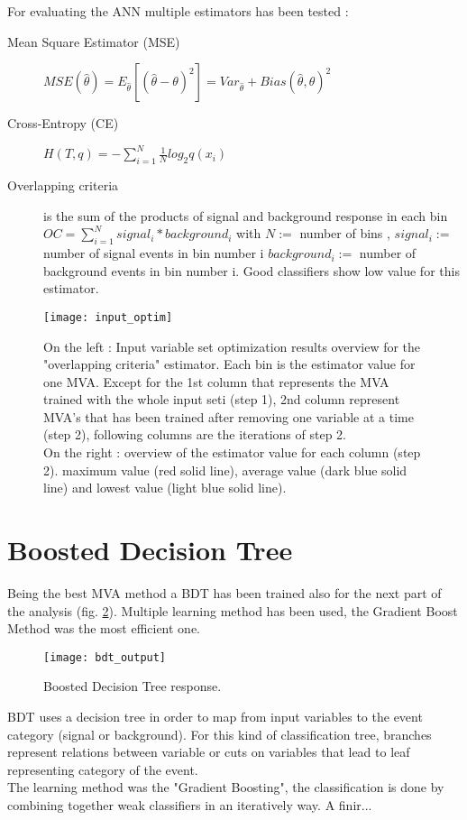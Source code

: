 For evaluating the ANN multiple estimators has been tested :
\begin{description}
	\item [Mean Square Estimator (MSE)] $ MSE(\hat{\theta}) = E_{\hat{\theta}} [(\hat{\theta} - \theta)^2] =
    Var_{\hat{\theta}} + Bias(\hat{\theta}, \theta)^2$
	\item [Cross-Entropy (CE)] $ H(T,q) = -\sum_{i=1}^{N}{\frac{1}{N} log_2 q(x_i)}$
	\item [Overlapping criteria] is the sum of the products of signal and background response in each bin $ OC =
    \sum_{i=1}^{N}{signal_i*background_i} $ with $N :=$ number of bins , $signal_i := $ number of signal events in bin
    number i $background_i := $ number of background events in bin number i. Good classifiers show low value for this estimator.
\end{description}

\begin{figure}[h!]
    \texttt{[image: input\_optim]}
    \caption{On the left : Input variable set optimization results overview for the "overlapping criteria" estimator.
    Each bin is the estimator value for one MVA. Except for
    the 1st column that represents the MVA trained with the whole input seti (step 1), 2nd column
    represent MVA's that has been trained after removing one variable at a time (step 2), following columns are the
    iterations of step 2.\\
    On the right : overview of the estimator value for each column (step 2). maximum value (red solid line), average
    value (dark blue solid line) and lowest value (light blue solid line).}
    \label{input_optim}
\end{figure}


\section{Boosted Decision Tree}

Being the best MVA method a BDT has been trained also for the next part of the analysis (fig. \ref{bdt_output}).
Multiple learning method has been used, the Gradient Boost Method was the most efficient one.
\begin{figure}[h!]
\centering
    \texttt{[image: bdt\_output]}
    \caption{Boosted Decision Tree response.}
    \label{bdt_output}
\end{figure}


BDT uses a decision tree in order to map from input variables to the event category (signal or background).
For this kind of classification tree, branches represent relations between variable or cuts on variables that lead to leaf representing category of the event.\\
The learning method was the "Gradient Boosting", the classification is done by combining together weak classifiers in an iteratively way.
A finir...


